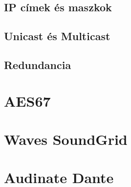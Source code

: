 \subsection{IP címek és maszkok}

\subsection{Unicast és Multicast}


\subsection{Redundancia}

 

\section{AES67}


\section{Waves SoundGrid} 


\section{Audinate Dante}


